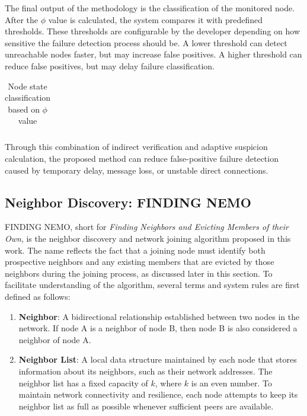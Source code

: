 The final output of the methodology is the classification of the monitored node. After the $\phi$ value is calculated,
the system compares it with predefined thresholds. These thresholds are configurable by the developer depending on how
sensitive the failure detection process should be. A lower threshold can detect unreachable nodes faster, but may
increase false positives. A higher threshold can reduce false positives, but may delay failure classification.

\begin{table}[h]
  \centering
  \caption{Node state classification based on $\phi$ value}
  \label{tab:phi_classification}
  \begin{tabular}{|c|c|}
    \hline

    \hline

    \hline

    \hline

    \hline

    \hline
  \end{tabular}
\end{table}

Through this combination of indirect verification and adaptive suspicion calculation, the proposed method can reduce
false-positive failure detection caused by temporary delay, message loss, or unstable direct connections.

\subsection{Neighbor Discovery: FINDING NEMO}
\label{subsec:node_discovery}

FINDING NEMO, short for \textit{Finding Neighbors and Evicting Members of their Own}, is the neighbor discovery and
network joining algorithm proposed in this work. The name reflects the fact that a joining node must identify both
prospective neighbors and any existing members that are evicted by those neighbors during the joining process, as
discussed later in this section. To facilitate understanding of the algorithm, several terms and system rules are first
defined as follows:

\begin{enumerate}
  \item \textbf{Neighbor}: A bidirectional relationship established between two nodes in the network. If
        node A is a neighbor of node B, then node B is also considered a neighbor of node A.

  \item \textbf{Neighbor List}: A local data structure maintained by each node that stores information
        about its neighbors, such as their network addresses. The neighbor list has a fixed capacity of $k$,
        where $k$ is an even number. To maintain network connectivity and resilience, each node attempts to
        keep its neighbor list as full as possible whenever sufficient peers are available.

\end{enumerate}

